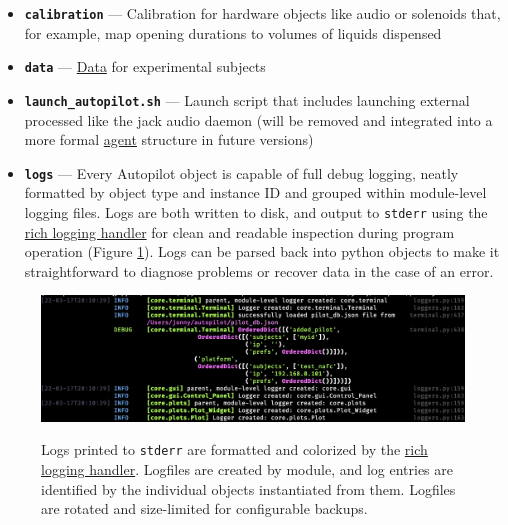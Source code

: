 \begin{itemize}
\item \textbf{\texttt{calibration}} --- Calibration for hardware objects like audio or solenoids that, for example, map opening durations to volumes of liquids dispensed
\item \textbf{\texttt{data}} --- \hyperref[sec:datamodel]{Data} for experimental subjects
\item \textbf{\texttt{launch\_autopilot.sh}} --- Launch script that includes launching external processed like the jack audio daemon (will be removed and integrated into a more formal \hyperref[sec:agents]{agent} structure in future versions)
\item \textbf{\texttt{logs}} --- Every Autopilot object is capable of full debug logging, neatly formatted by object type and instance ID and grouped within module-level logging files. Logs are both written to disk, and output to \texttt{stderr} using the \href{https://rich.readthedocs.io/en/latest/reference/logging.html#logging}{rich logging handler} for clean and readable inspection during program operation (Figure \ref{fig:logging}). Logs can be parsed back into python objects to make it straightforward to diagnose problems or recover data in the case of an error.
\end{itemize}
\begin{figure}
\includegraphics[width=\linewidth]{figures/logging.png}
\label{fig:logging}
\caption{Logs printed to \texttt{stderr} are formatted and colorized by the \href{https://rich.readthedocs.io/en/latest/reference/logging.html\#logging}{rich logging handler}. Logfiles are created by module, and log entries are identified by the individual objects instantiated from them. Logfiles are rotated and size-limited for configurable backups.}
\end{figure}

